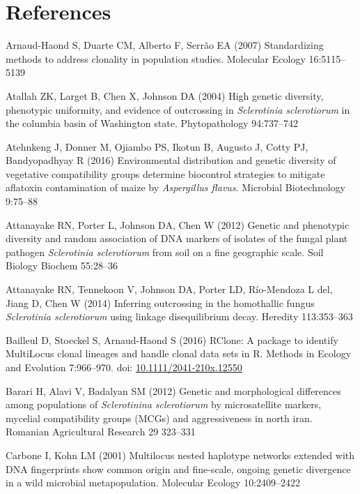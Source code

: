 \section*{References}\label{references}

\hypertarget{refs}{}
\hypertarget{ref-Arnaud-Haond2007-zo}{}
Arnaud-Haond S, Duarte CM, Alberto F, Serrão EA (2007) Standardizing
methods to address clonality in population studies. Molecular Ecology
16:5115--5139

\hypertarget{ref-Atallah2004-es}{}
Atallah ZK, Larget B, Chen X, Johnson DA (2004) High genetic diversity,
phenotypic uniformity, and evidence of outcrossing in \emph{Sclerotinia
sclerotiorum} in the columbia basin of Washington state. Phytopathology
94:737--742

\hypertarget{ref-Atehnkeng2016-qb}{}
Atehnkeng J, Donner M, Ojiambo PS, Ikotun B, Augusto J, Cotty PJ,
Bandyopadhyay R (2016) Environmental distribution and genetic diversity
of vegetative compatibility groups determine biocontrol strategies to
mitigate aflatoxin contamination of maize by \emph{Aspergillus flavus}.
Microbial Biotechnology 9:75--88

\hypertarget{ref-Attanayake2012-mq}{}
Attanayake RN, Porter L, Johnson DA, Chen W (2012) Genetic and
phenotypic diversity and random association of DNA markers of isolates
of the fungal plant pathogen \emph{Sclerotinia sclerotiorum} from soil on a
fine geographic scale. Soil Biology Biochem 55:28--36

\hypertarget{ref-Attanayake2014-uy}{}
Attanayake RN, Tennekoon V, Johnson DA, Porter LD, Río-Mendoza L del,
Jiang D, Chen W (2014) Inferring outcrossing in the homothallic fungus
\emph{Sclerotinia sclerotiorum} using linkage disequilibrium decay.
Heredity 113:353--363

\hypertarget{ref-Bailleul2016-lw}{}
Bailleul D, Stoeckel S, Arnaud-Haond S (2016) RClone: A package to
identify MultiLocus clonal lineages and handle clonal data sets in R.
Methods in Ecology and Evolution 7:966--970. doi:
\href{https://doi.org/10.1111/2041-210x.12550}{10.1111/2041-210x.12550}

\hypertarget{ref-Barari2012-dn}{}
Barari H, Alavi V, Badalyan SM (2012) Genetic and morphological
differences among populations of \emph{Sclerotinina sclerotiorum} by
microsatellite markers, mycelial compatibility groups (MCGs) and
aggressiveness in north iran. Romanian Agricultural Research 29 323--331

\hypertarget{ref-Carbone2001-hi}{}
Carbone I, Kohn LM (2001) Multilocus nested haplotype networks extended
with DNA fingerprints show common origin and fine-scale, ongoing genetic
divergence in a wild microbial metapopulation. Molecular Ecology
10:2409--2422

